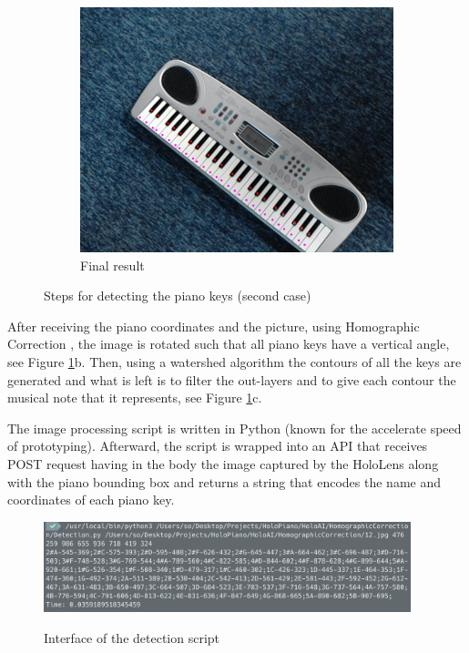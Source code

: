 \documentclass[12 pct]{report}
\begin{document}
\begin{figure}[H]
\begin{subfigure}[b]{0.7\linewidth}
    \includegraphics[width=\linewidth]{piano-pointsv2}
    \caption{Final result}
  \end{subfigure}
  \caption{Steps for detecting the piano keys (second case)}
  \label{fig:coffee3}
\end{figure}

After receiving the piano coordinates and the picture, using Homographic Correction \cite{opencvhomography}, the image is rotated such that all piano keys have a vertical angle, see Figure \ref{fig:coffee3}b. 
Then, using a watershed algorithm \cite{wang2009image} the contours of all the keys are generated and what is left is to filter the out-layers and to give each contour the musical note that it represents, see Figure \ref{fig:coffee3}c. 

The image processing script is written in Python \cite{oliphant2007python} (known for the accelerate speed of prototyping). 
Afterward, the script is wrapped into an API that receives POST request having in the body the image captured by the HoloLens along with the piano bounding box and returns a string that encodes the name and coordinates of each piano key.

\begin{figure}[H]
\includegraphics[width=0.95\textwidth]{holopiano-detection}
\centering
\label{fig:feature-points}
\caption{Interface of the detection script}
\end{figure}
\end{document}
